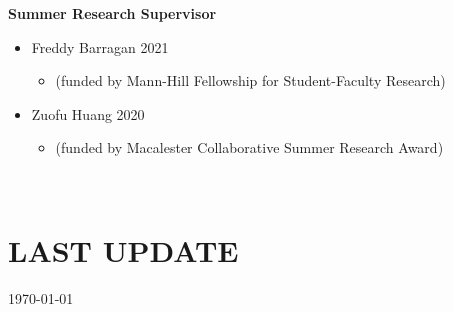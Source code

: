 \documentclass[margin]{res}
\begin{document}
\begin{resume}
\textbf{Summer Research Supervisor}
\begin{itemize}
\item Freddy Barragan \hfill 2021 
	\begin{itemize} \vspace{-0.2cm}
	\item[] 
	\begin{footnotesize}(funded by Mann-Hill Fellowship for Student-Faculty Research) \end{footnotesize}
	\end{itemize} \vspace{-0.1cm}
\item Zuofu Huang \hfill 2020 
	\begin{itemize} \vspace{-0.2cm}
	\item[] 
	\begin{footnotesize}(funded by Macalester Collaborative Summer Research Award)\end{footnotesize} \vspace{-0.1cm}\\
	\end{itemize}
\end{itemize}

	
	

	
		


			
\section{LAST UPDATE} \today

\end{resume}
\end{document}
